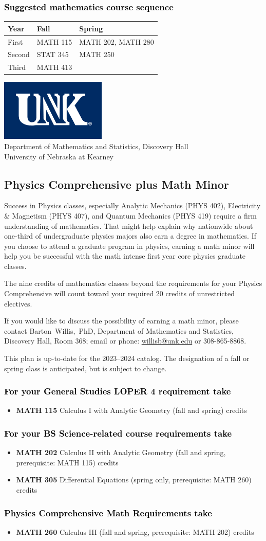 \documentclass[11pt]{article}
\makeatletter
\newcommand{\calcone}{\textbf{MATH 115} Calculus I with Analytic Geometry (fall and spring) \dotfill 5 credits}
\newcommand{\calconeshort}{MATH 115}
\newcommand{\calctwo}{\textbf{MATH 202} Calculus II with Analytic Geometry (fall and spring, prerequisite: MATH 115) \dotfill 5 credits }
\newcommand{\calctwoshort}{MATH 202}
\newcommand{\foundationsshort}{MATH 250}
\newcommand{\calcthree}{\textbf{MATH 260} Calculus III  (fall and spring, prerequisite: MATH 202) \dotfill 5 credits}
\newcommand{\linearshort}{MATH 280}
\newcommand{\discreteshort}{MATH 413}
\newcommand{\diffeq}{\textbf{MATH 305}	Differential Equations (spring only, prerequisite: MATH 260) \dotfill 	3 credits}
\newcommand{\appliedstatshort}{STAT 345}
\newcommand{\contactbw}{\mbox{Barton Willis, PhD}, Department of Mathematics and Statistics,  Discovery Hall, Room 368;
email or phone: \href{mailto:willisb@unk.edu}{willisb@unk.edu} or 308-865-8868.}
\newcommand{\forinfo}[2]{If you would like to discuss the possibility of earning a math {#1}, please contact \contactbw}
\newcommand{\catalog}{2023--2024 }
\newcommand{\LOPER}{LOPER\xspace}
\newcommand{\uptodate}{This plan is up-to-date for  the \catalog catalog. The designation of a fall or spring class is 
anticipated, but  is subject to change.}
\newcommand{\myheading}{
\begin{flushleft}
\includegraphics[scale=0.35]{unk-logo}\\
\setcounter{footnote}{0}
\vspace{0.25in}
 \textcolor{unkblue}{Department of Mathematics and Statistics, Discovery Hall} \\
  \textcolor{unkblue}{University of Nebraska at Kearney}
\end{flushleft}}
\newcommand{\mathminor}{
  \begin{center}
   \begin{tabular}[h]{| l | l | l|} 
      \hline
      \textbf{Year} & \textbf{Fall}         &  \textbf{Spring}  \\ \hline 
      First & \calconeshort & \calctwoshort, \linearshort \\  \hline
      Second &  \appliedstatshort{} &  \foundationsshort \\ \hline
      Third &    \discreteshort              &  \\ \hline
      \end{tabular}
      \end{center}}
\makeatother
\begin{document}
\subsubsection*{\textcolor{black}{Suggested mathematics course sequence}}

\mathminor




\newpage

\myheading


\subsection*{\textbf{\textcolor{unkblue}{Physics Comprehensive plus Math Minor}}}

\noindent Success in Physics classes, especially  Analytic Mechanics (PHYS 402), Electricity \& Magnetism (PHYS 407), and Quantum Mechanics (PHYS 419) require a 
firm understanding of mathematics. That might help explain why 
nationwide about one-third of undergraduate physics majors also 
earn a degree in mathematics. If you choose to attend a graduate 
program in physics, earning a math minor will help you be successful 
with the math intense first year core physics graduate classes.

The nine credits of mathematics classes beyond the requirements for 
your Physics Comprehensive will count toward your required 
20 credits of unrestricted electives.


\forinfo{minor}{Physics Comprehensive}

\uptodate

\subsubsection*{\textcolor{black}{For your General Studies \LOPER 4 requirement take}}
\begin{itemize}
\item \calcone
\end{itemize}

\subsubsection*{\textcolor{black}{For your BS Science-related course requirements take}}
\begin{itemize}
\item \calctwo
\item \diffeq
\end{itemize}


\subsubsection*{\textcolor{black}{Physics Comprehensive Math Requirements take}}
\begin{itemize}
 \item \calcthree
\end{itemize}
\end{document}
